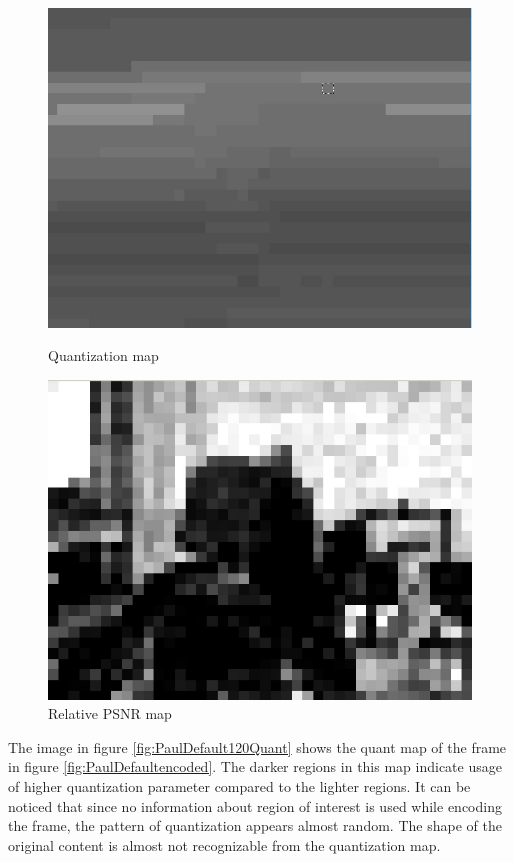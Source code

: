 \documentclass[11pt]{article} %
\begin{document}
\begin{figure}[!h]
    \centering
    \includegraphics[scale=0.5]{PaulDefault120_91250kbps_quant}
    \caption{Quantization map}
    \label{fig:PaulDefault120Quant}
    \includegraphics[scale=0.5]{PaulDefault120_91250kbps_psnr}
    \caption{Relative PSNR map}
    \label{fig:PaulDefault120PSNR}
\end{figure} 

The image in figure \ref{fig:PaulDefault120Quant} shows the quant map of the frame in figure \ref{fig:PaulDefaultencoded}. The darker regions in this map indicate usage of higher quantization parameter compared to the lighter regions. It can be noticed that since no information about region of interest is used while encoding the frame, the pattern of quantization appears almost random. The shape of the original content is almost not recognizable from the quantization map.
\end{document}
